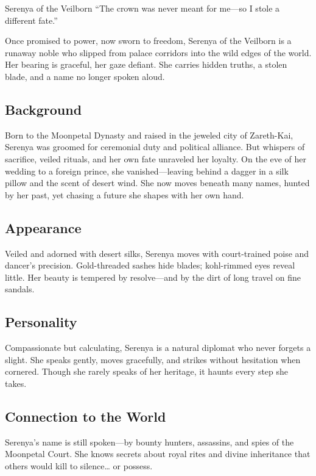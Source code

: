 \newpage
\begin{WyrdCharacterSheet}
    {Serenya of the Veilborn}
    {“The crown was never meant for me—so I stole a different fate.”}
    \label{pc:serenya-veilborn}

    Once promised to power, now sworn to freedom, Serenya of the Veilborn is a runaway noble who slipped from palace corridors into the wild edges of the world. Her bearing is graceful, her gaze defiant. She carries hidden truths, a stolen blade, and a name no longer spoken aloud.

    \subsection{Background}
    Born to the Moonpetal Dynasty and raised in the jeweled city of Zareth-Kai, Serenya was groomed for ceremonial duty and political alliance. But whispers of sacrifice, veiled rituals, and her own fate unraveled her loyalty. On the eve of her wedding to a foreign prince, she vanished—leaving behind a dagger in a silk pillow and the scent of desert wind. She now moves beneath many names, hunted by her past, yet chasing a future she shapes with her own hand.

    \subsection{Appearance}
    Veiled and adorned with desert silks, Serenya moves with court-trained poise and dancer’s precision. Gold-threaded sashes hide blades; kohl-rimmed eyes reveal little. Her beauty is tempered by resolve—and by the dirt of long travel on fine sandals.

    \subsection{Personality}
    Compassionate but calculating, Serenya is a natural diplomat who never forgets a slight. She speaks gently, moves gracefully, and strikes without hesitation when cornered. Though she rarely speaks of her heritage, it haunts every step she takes.

    \subsection{Connection to the World}
    Serenya’s name is still spoken—by bounty hunters, assassins, and spies of the Moonpetal Court. She knows secrets about royal rites and divine inheritance that others would kill to silence… or possess.


\end{WyrdCharacterSheet}
